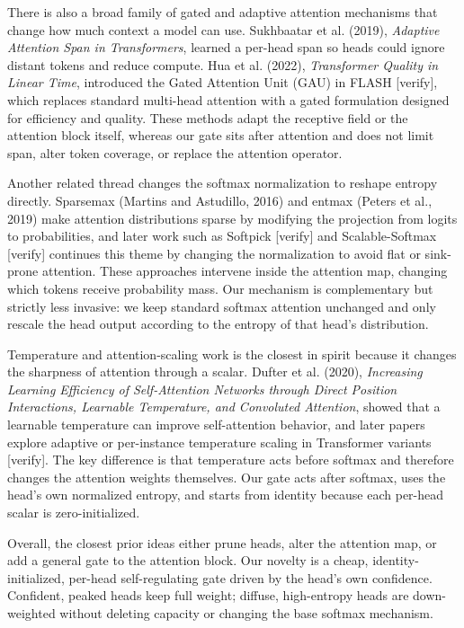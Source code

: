 \documentclass[11pt,a4paper]{article}
\begin{document}
There is also a broad family of gated and adaptive attention mechanisms that change how much context a model can use. Sukhbaatar et al. (2019), \emph{Adaptive Attention Span in Transformers}, learned a per-head span so heads could ignore distant tokens and reduce compute. Hua et al. (2022), \emph{Transformer Quality in Linear Time}, introduced the Gated Attention Unit (GAU) in FLASH [verify], which replaces standard multi-head attention with a gated formulation designed for efficiency and quality. These methods adapt the receptive field or the attention block itself, whereas our gate sits after attention and does not limit span, alter token coverage, or replace the attention operator.

Another related thread changes the softmax normalization to reshape entropy directly. Sparsemax (Martins and Astudillo, 2016) and entmax (Peters et al., 2019) make attention distributions sparse by modifying the projection from logits to probabilities, and later work such as Softpick [verify] and Scalable-Softmax [verify] continues this theme by changing the normalization to avoid flat or sink-prone attention. These approaches intervene inside the attention map, changing which tokens receive probability mass. Our mechanism is complementary but strictly less invasive: we keep standard softmax attention unchanged and only rescale the head output according to the entropy of that head's distribution.

Temperature and attention-scaling work is the closest in spirit because it changes the sharpness of attention through a scalar. Dufter et al. (2020), \emph{Increasing Learning Efficiency of Self-Attention Networks through Direct Position Interactions, Learnable Temperature, and Convoluted Attention}, showed that a learnable temperature can improve self-attention behavior, and later papers explore adaptive or per-instance temperature scaling in Transformer variants [verify]. The key difference is that temperature acts before softmax and therefore changes the attention weights themselves. Our gate acts after softmax, uses the head's own normalized entropy, and starts from identity because each per-head scalar is zero-initialized.

Overall, the closest prior ideas either prune heads, alter the attention map, or add a general gate to the attention block. Our novelty is a cheap, identity-initialized, per-head self-regulating gate driven by the head's own confidence. Confident, peaked heads keep full weight; diffuse, high-entropy heads are down-weighted without deleting capacity or changing the base softmax mechanism.
\end{document}
